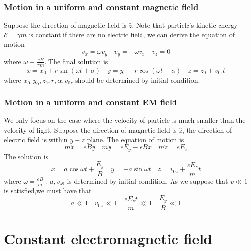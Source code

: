 \subsubsection{Motion in a uniform and constant magnetic field}
Suppose the direction of magnetic field is $\hat{z}$. Note that particle's kinetic energy $\mathcal{E} = \gamma m$ is constant if there are no electric field, we can derive the equation of motion
\[\dot{v}_x = \omega v_y \quad \dot{v}_y = -\omega v_x \quad \dot{v}_z = 0\]
where $\omega \equiv \frac{eB}{\gamma m}$. The final solution is
\[x = x_0 + r\sin(\omega t + \alpha) \quad y = y_0 + r\cos(\omega t + \alpha) \quad z = z_0 + v_{0z}t\]
where $x_0,y_0,z_0,r,\alpha,v_{0z}$ should be determined by initial condition.

\subsubsection{Motion in a uniform and constant EM field}
We only focus on the case where the velocity of particle is much smaller than the velocity of light. 
Suppose the direction of magnetic field is $\hat{z}$, the direction of electric field is within $y-z$ plane. The equation of motion is
\[m\ddot{x} = eB\dot{y} \quad m\ddot{y} =eE_y - eB\dot{x} \quad m\ddot{z}=eE_z\]
The solution is
\[\dot{x} = a \cos \omega t + \frac{E_y}{B} \quad \dot{y} = -a\sin \omega t \quad \dot{z} = v_{0z} + \frac{eE_z}{m}t\]
where $\omega = \frac{eB}{m}$ , $a,v_{z0}$ is determined by initial condition. As we suppose that $v \ll 1$ is satisfied,we must have that
\[a \ll 1 \quad v_{0z} \ll 1 \quad \frac{eE_z t}{m} \ll 1 \quad \frac{E_y}{B} \ll 1\]

\section{Constant electromagnetic field}
